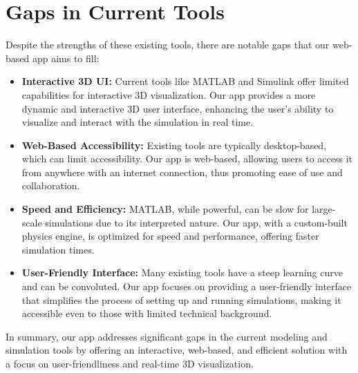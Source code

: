 \section{Gaps in Current Tools}

Despite the strengths of these existing tools, there are notable gaps that our web-based app aims to fill:

\begin{itemize}
    \item \textbf{Interactive 3D UI:} Current tools like MATLAB and Simulink offer limited capabilities for interactive 3D visualization. Our app provides a more dynamic and interactive 3D user interface, enhancing the user's ability to visualize and interact with the simulation in real time.
    \item \textbf{Web-Based Accessibility:} Existing tools are typically desktop-based, which can limit accessibility. Our app is web-based, allowing users to access it from anywhere with an internet connection, thus promoting ease of use and collaboration.
    \item \textbf{Speed and Efficiency:} MATLAB, while powerful, can be slow for large-scale simulations due to its interpreted nature. Our app, with a custom-built physics engine, is optimized for speed and performance, offering faster simulation times.
    \item \textbf{User-Friendly Interface:} Many existing tools have a steep learning curve and can be convoluted. Our app focuses on providing a user-friendly interface that simplifies the process of setting up and running simulations, making it accessible even to those with limited technical background.
\end{itemize}

In summary, our app addresses significant gaps in the current modeling and simulation tools by offering an interactive, web-based, and efficient solution with a focus on user-friendliness and real-time 3D visualization.



